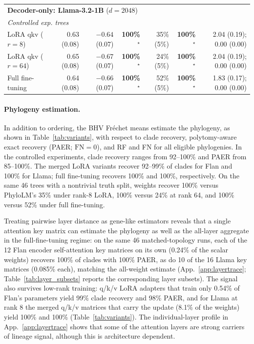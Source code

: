 \documentclass{article}
\theoremstyle{definition}
\theoremstyle{plain}
\begin{document}
\begin{table}[h]
\begin{center}
{\begin{tabular}{lrrrrrr}
\midrule
\multicolumn{7}{l}{\textbf{Decoder-only: Llama-3.2-1B} ($d=2048$)} \\
\multicolumn{7}{l}{\quad\textit{Controlled exp. trees}} \\
\quad LoRA qkv ($r{=}8$)                 & 0.63 (0.08) & $-0.64$ (0.07) & \textbf{100\%}$^\star$ & 35\% (5\%) & \textbf{100\%}$^\star$ & 2.04 (0.19); 0.00 (0.00) \\
\quad LoRA qkv ($r{=}64$)                & 0.65 (0.08) & $-0.67$ (0.07) & \textbf{100\%}$^\star$ & 24\% (5\%) & \textbf{100\%}$^\star$ & 2.04 (0.19); 0.00 (0.00) \\
\quad Full fine-tuning                   & 0.64 (0.08) & $-0.66$ (0.07) & \textbf{100\%}$^\star$ & 52\% (5\%) & \textbf{100\%}$^\star$ & 1.83 (0.17); 0.00 (0.00) \\
\bottomrule
\end{tabular}
}
\end{center}
\end{table}



\paragraph{Phylogeny estimation.}
\label{sec:results:weighttree}
In addition to ordering, the BHV Fr\'echet means estimate the phylogeny, as shown in Table~\ref{tab:variants}, with respect to clade recovery, polytomy-aware exact recovery (PAER; $\mathrm{FN}=0$), and RF and FN for all eligible phylogenies. In the controlled experiments, clade recovery ranges from 92--100\% and PAER from 85--100\%. The merged LoRA variants recover 92--99\% of clades for Flan and 100\% for Llama; full fine-tuning recovers 100\% and 100\%, respectively. On the same 46 trees with a nontrivial truth split, weights recover 100\% versus PhyloLM's 35\% under rank-8 LoRA, 100\% versus 24\% at rank 64, and 100\% versus 52\% under full fine-tuning.

Treating pairwise layer distance as gene-like estimators reveals that a single attention key matrix can estimate the phylogeny as well as the all-layer aggregate in the full-fine-tuning regime: on the same 46 matched-topology runs, each of the 12 Flan encoder self-attention key matrices on its own (0.24\% of the scalar weights) recovers 100\% of clades with 100\% PAER, as do 10 of the 16 Llama key matrices (0.085\% each), matching the all-weight estimate (App.~\ref{app:layertrace}; Table~\ref{tab:layer_subsets} reports the corresponding layer subsets). The signal also survives low-rank training: q/k/v LoRA adapters that train only 0.54\% of Flan's parameters yield 99\% clade recovery and 98\% PAER, and for Llama at rank 8 the merged q/k/v matrices that carry the update (8.1\% of the weights) yield 100\% and 100\% (Table~\ref{tab:variants}). The individual-layer profile in App.~\ref{app:layertrace} shows that some of the attention layers are strong carriers of lineage signal, although this is architecture dependent.
\end{document}

